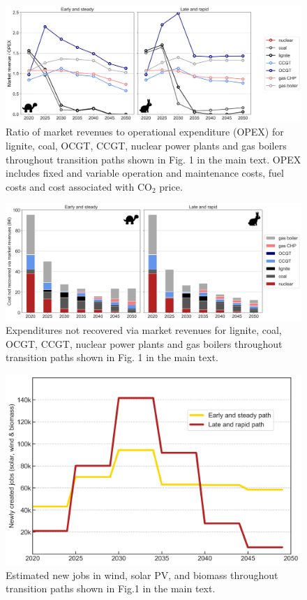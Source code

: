 \documentclass[3p]{elsarticle} %
\begin{document}
\begin{figure}[!h]
\centering
\includegraphics[width=\columnwidth]{../figures/revenue_vs_variablecost_Base.png}
\caption{Ratio of market revenues to operational expenditure (OPEX) for lignite, coal, OCGT, CCGT, nuclear power plants and gas boilers throughout transition paths shown in Fig. 1 in the main text. OPEX includes fixed and variable operation and maintenance costs, fuel costs and cost associated with CO$_2$ price. } \label{fig_revenues_vs_variable} 
\end{figure}
\clearpage

\begin{figure}[!h]
\centering
\includegraphics[width=\columnwidth]{../figures/deficit_Base.png}
\caption{Expenditures not recovered via market revenues for lignite, coal, OCGT, CCGT, nuclear power plants and gas boilers throughout transition paths shown in Fig. 1 in the main text.} \label{fig_deficit} 
\end{figure}
\clearpage

\begin{figure}[!h]
\centering
\includegraphics[width=0.7\columnwidth]{../figures/jobs.png}
\caption{Estimated new jobs in wind, solar PV, and biomass throughout transition paths shown in Fig.1 in the main text.} \label{fig_jobs} 
\end{figure}
\clearpage
\end{document}
